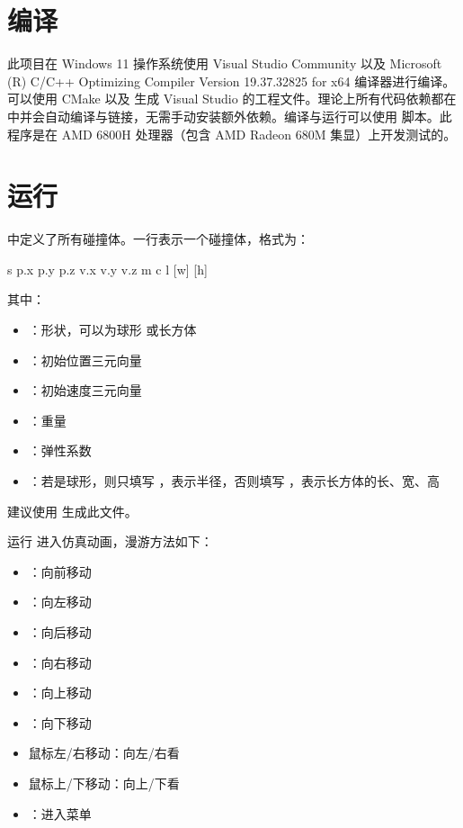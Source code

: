


\section{编译}

此项目在 Windows 11 操作系统使用 Visual Studio Community 以及 Microsoft (R) C/C++ Optimizing Compiler Version 19.37.32825 for x64 编译器进行编译。可以使用 CMake 以及  生成 Visual Studio 的工程文件。理论上所有代码依赖都在  中并会自动编译与链接，无需手动安装额外依赖。编译与运行可以使用  脚本。此程序是在 AMD 6800H 处理器（包含 AMD Radeon 680M 集显）上开发测试的。

\section{运行}

 中定义了所有碰撞体。一行表示一个碰撞体，格式为：

\begin{codeblock}
s p.x p.y p.z v.x v.y v.z m c l [w] [h]
\end{codeblock}

其中：

\begin{itemize}
    \item {}：形状，可以为球形  或长方体 
    \item {}：初始位置三元向量
    \item {}：初始速度三元向量
    \item {}：重量
    \item {}：弹性系数
    \item {}：若是球形，则只填写 ，表示半径，否则填写 ，表示长方体的长、宽、高
\end{itemize}

建议使用  生成此文件。

运行  进入仿真动画，漫游方法如下：

\begin{multicols}{2}

\begin{itemize}
    \item {}：向前移动
    \item {}：向左移动
    \item {}：向后移动
    \item {}：向右移动
    \columnbreak
    \item \keys{\SPACE}：向上移动
    \item \keys{\shift}：向下移动
    \item 鼠标左/右移动：向左/右看
    \item 鼠标上/下移动：向上/下看
    \item {}：进入菜单
\end{itemize}

\end{multicols}

